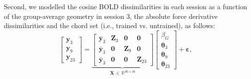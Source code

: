 \documentclass{article}
\begin{document}
Second, we modelled the cosine BOLD dissimilarities in each session as a function of the group-average geometry in session 3, the absolute force derivative dissimilarities and the chord set (i.e., trained vs. untrained), as follows:
\begin{equation}
    \begin{bmatrix} \mathbf{y}_3 \\ \mathbf{y}_9 \\ \mathbf{y}_{23} \end{bmatrix}
    =
    \underbrace{\begin{bmatrix}
        \bar{\mathbf{y}}_3 & \mathbf{Z}_3 & \mathbf{0} & \mathbf{0} \\
        \bar{\mathbf{y}}_3 & \mathbf{0} & \mathbf{Z}_9 & \mathbf{0} \\
        \bar{\mathbf{y}}_3 & \mathbf{0} & \mathbf{0} & \mathbf{Z}_{23}
    \end{bmatrix}}_{\mathbf{X} \,\in\, \mathbb{R}^{36 \times 10}}
    \begin{bmatrix} \beta_G \\ \boldsymbol{\theta}_3 \\ \boldsymbol{\theta}_9 \\ \boldsymbol{\theta}_{23} \end{bmatrix}
    + \boldsymbol{\varepsilon},
    \label{eq:ancova}
\end{equation}
\end{document}
